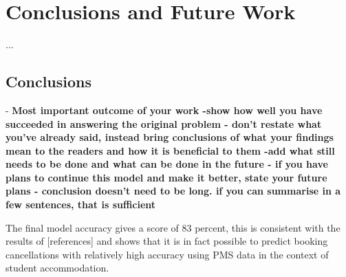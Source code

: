 \chapter{Conclusions and Future Work}
\label{ch:con}
...

\section{Conclusions}
- \textbf{Most important outcome of your work 
-show how well you have succeeded in answering the original problem
- don't restate what you've already said, instead bring conclusions of what your findings mean to the readers and how it is beneficial to them
-add what still needs to be done and what can be done in the future
- if you have plans to continue this model and make it better, state your future plans
- conclusion doesn't need to be long. if you can summarise in a few sentences, that is sufficient }

The final model accuracy gives a score  of 83 percent, this is consistent with the results of [references] and shows that it is in fact possible to predict booking cancellations with relatively high accuracy using PMS data in the context of student accommodation. 



